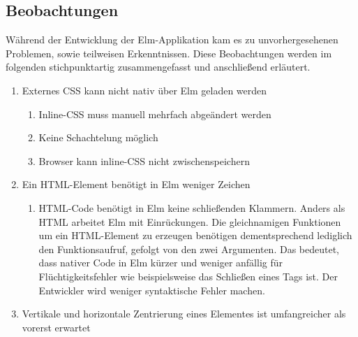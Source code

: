 \subsection{Beobachtungen}
\label{sec:Beobachtungen}
Während der Entwicklung der Elm-Applikation kam es zu unvorhergesehenen Problemen, sowie teilweisen Erkenntnissen. Diese Beobachtungen werden im folgenden stichpunktartig zusammengefasst und anschließend erläutert.
\begin{enumerate}[label*=\arabic*.]

\item Externes \ac{CSS} kann nicht nativ über Elm geladen werden
	\begin{enumerate}[label*=\arabic*.]
		\item Inline-\ac{CSS} muss manuell mehrfach abgeändert werden
		\item Keine Schachtelung möglich
		\item Browser kann inline-\ac{CSS} nicht zwischenspeichern
	\end{enumerate}
\item Ein HTML-Element benötigt in Elm weniger Zeichen
	\begin{enumerate}[label*=\arabic*.]
		\item \ac{HTML}-Code benötigt in Elm keine schließenden Klammern. Anders als \ac{HTML} arbeitet Elm mit Einrückungen. Die gleichnamigen Funktionen um ein \ac{HTML}-Element zu erzeugen benötigen dementsprechend lediglich den Funktionsaufruf, gefolgt von den zwei Argumenten. Das bedeutet, dass nativer Code in Elm kürzer und weniger anfällig für Flüchtigkeitsfehler wie beispielsweise das Schließen eines Tags ist. Der Entwickler wird weniger syntaktische Fehler machen.
	\end{enumerate}
\item Vertikale und horizontale Zentrierung eines Elementes ist umfangreicher als vorerst erwartet
	\begin{enumerate}[label*=\arabic*.]

\end{enumerate}
\end{enumerate}
